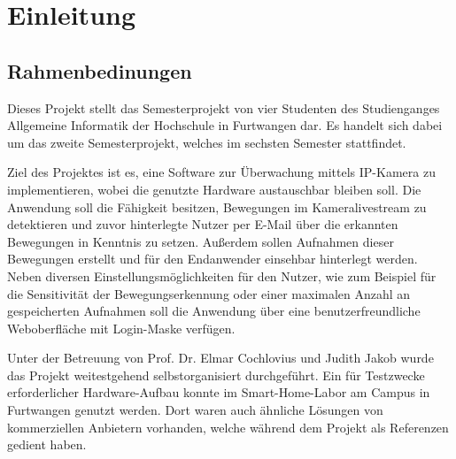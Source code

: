\chapter{Einleitung}
\section{Rahmenbedinungen}
Dieses Projekt stellt das Semesterprojekt von vier Studenten des Studienganges Allgemeine Informatik der Hochschule in Furtwangen dar. Es handelt sich dabei um das zweite Semesterprojekt, welches im sechsten Semester stattfindet. 

Ziel des Projektes ist es, eine Software zur Überwachung mittels \acs{IP}-Kamera zu implementieren, wobei die genutzte Hardware austauschbar bleiben soll. Die Anwendung soll die Fähigkeit besitzen, Bewegungen im Kameralivestream zu detektieren und zuvor hinterlegte Nutzer per E-Mail über die erkannten Bewegungen in Kenntnis zu setzen. Außerdem sollen Aufnahmen dieser Bewegungen erstellt und für den Endanwender einsehbar hinterlegt werden. Neben diversen Einstellungsmöglichkeiten für den Nutzer, wie zum Beispiel für die Sensitivität der Bewegungserkennung oder einer maximalen Anzahl an gespeicherten Aufnahmen soll die Anwendung über eine benutzerfreundliche Weboberfläche mit Login-Maske verfügen.

Unter der Betreuung von Prof. Dr. Elmar Cochlovius und Judith Jakob wurde das Projekt weitestgehend selbstorganisiert durchgeführt. Ein für Testzwecke erforderlicher Hardware-Aufbau konnte im Smart-Home-Labor am Campus in Furtwangen genutzt werden. Dort waren auch ähnliche Lösungen von kommerziellen Anbietern vorhanden, welche während dem Projekt als Referenzen gedient haben.